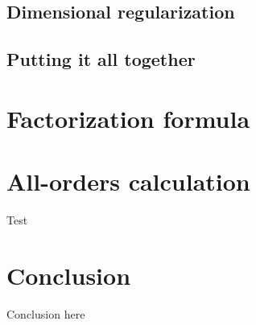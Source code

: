 \documentclass[12pt,twoside]{reedthesis}
\begin{document}
	\section{Dimensional regularization}

	\section{Putting it all together}


\chapter{Factorization formula}
	
	\graphicspath{{factorization/figures/}}

	


\chapter{All-orders calculation}
	Test
	

\chapter*{Conclusion}
\setcounter{chapter}{4}
\setcounter{section}{0}
	
	Conclusion here 





  \backmatter %



%  
 

\end{document}
